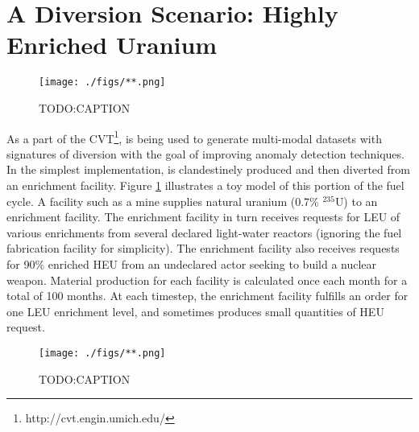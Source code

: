 \section{A Diversion Scenario: Highly Enriched Uranium}
\label{s_results}



\begin{figure}%
\begin{center}
\texttt{[image: ./figs/**.png]}
\end{center}
\caption{TODO:CAPTION}
\label{fig:scenario_layout}
\end{figure}


As a part of the \gls{CVT}\footnote{http://cvt.engin.umich.edu/}, \Cyclus is being used to generate multi-modal datasets with signatures of diversion with the goal of improving anomaly detection techniques. In the simplest implementation,  is clandestinely produced and then diverted from an enrichment facility.  Figure \ref{fig:scenario_layout} illustrates a toy model of this portion of the fuel cycle. A facility such as a mine supplies natural uranium (0.7\% $^{235}$U) to an enrichment facility. The enrichment facility in turn receives requests for \gls{LEU} of various enrichments from several declared light-water reactors (ignoring the fuel fabrication facility for simplicity).  The enrichment facility also receives requests for 90\% enriched \gls{HEU} from an undeclared actor seeking to build a nuclear weapon. Material production for each facility is calculated once each month for a total of 100 months. At each timestep, the enrichment facility fulfills an order for one \gls{LEU} enrichment level, and sometimes produces small quantities of \gls{HEU} request. 


\begin{figure}%
\begin{center}
\texttt{[image: ./figs/**.png]}
\end{center}
\caption{TODO:CAPTION}
\label{fig:time_series}
\end{figure}

